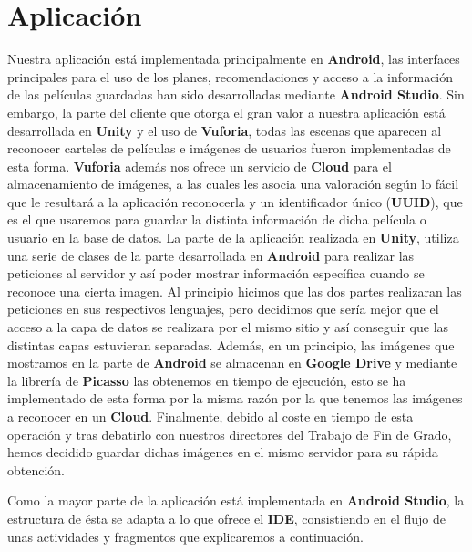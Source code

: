 \section{Aplicación}
\label{makereference4.3}
Nuestra aplicación está implementada principalmente en \textbf{Android}, las interfaces principales para el uso de los planes, recomendaciones y acceso a la información de las películas guardadas han sido desarrolladas mediante \textbf{Android Studio}. Sin embargo,
la parte del cliente que otorga el gran valor a nuestra aplicación está desarrollada en \textbf{Unity} y el uso de \textbf{Vuforia}, todas las escenas que aparecen al reconocer carteles de películas e imágenes de usuarios fueron implementadas de esta forma. \textbf{Vuforia} además nos ofrece un
servicio de \textbf{Cloud} para el almacenamiento de imágenes, a las cuales les asocia una valoración según lo fácil que le resultará a la aplicación reconocerla y un identificador único (\textbf{UUID}), que es el que usaremos para guardar la distinta información de dicha película o usuario en la base de datos.
La parte de la aplicación realizada en \textbf{Unity}, utiliza una serie de clases de la parte desarrollada en \textbf{Android} para realizar las peticiones al servidor y así poder mostrar información específica cuando se reconoce una cierta imagen.
Al principio hicimos que las dos partes realizaran las peticiones en sus respectivos lenguajes, pero decidimos que sería mejor que el acceso a la capa de datos se realizara por el mismo sitio y así conseguir que las distintas capas estuvieran separadas.
Además, en un principio, las imágenes que mostramos en la parte de \textbf{Android} se almacenan en \textbf{Google Drive} y mediante la librería de \textbf{Picasso} las obtenemos en tiempo de ejecución, esto se ha implementado de esta forma por la misma razón por la que tenemos las imágenes a reconocer en un \textbf{Cloud}.
Finalmente, debido al coste en tiempo de esta operación y tras debatirlo con nuestros directores del Trabajo de Fin de Grado, hemos decidido guardar dichas imágenes en el mismo servidor para su rápida obtención.


Como la mayor parte de la aplicación está implementada en \textbf{Android Studio}, la estructura de ésta se adapta a lo que ofrece el \textbf{IDE}, consistiendo en el flujo de unas actividades y fragmentos que explicaremos a continuación.


